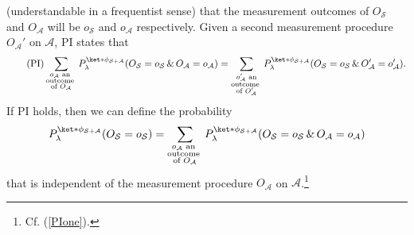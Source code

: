 \documentclass[12pt]{report}
\begin{document}
  (understandable in a frequentist sense) that the measurement outcomes of $O_{\mathcal{S}}$ and $O_{\mathcal{A}}$ will be $o_{\mathcal{S}}$  and $o_{\mathcal{A}}$ respectively. Given a second measurement procedure $O_{\mathcal{A}}'$ on $\mathcal{A}$, PI states that
\begin{equation}\tag{PI}
	\sum_{\substack{o_\mathcal{A}\text{ an }\\ \text{outcome }\\ 
	 \text{of }O_{\mathcal{A}}}}P_\lambda^{\ket*{\phi}_{\mathcal{S}+\mathcal{A}}}(O_\mathcal{S}=o_\mathcal{S}\, \& \,O_\mathcal{A}=o_\mathcal{A}) = \sum_{\substack{o_\mathcal{A}'\text{ an}\\ \text{outcome }\\ 
	 \text{of }O_{\mathcal{A}}'}}P_\lambda^{\ket*{\phi}_{\mathcal{S}+\mathcal{A}}}(O_\mathcal{S}=o_\mathcal{S}\, \& \,O'_\mathcal{A}=o'_\mathcal{A}). 
\end{equation}
If PI holds, then we can define the probability
\begin{equation}\label{generalPI}
	P^{\ket*{\phi}_{\mathcal{S}+\mathcal{A}}}_{\lambda}(O_\mathcal{S}=o_\mathcal{S})=\sum_{\substack{o_\mathcal{A}\text{ an }\\ \text{outcome }\\ 
	\text{of }O_{\mathcal{A}}}}P_\lambda^{\ket*{\phi}_{\mathcal{S}+\mathcal{A}}}(O_\mathcal{S}=o_\mathcal{S}\, \& \,O_\mathcal{A}=o_\mathcal{A})
\end{equation} %
%
that is independent of the measurement procedure $O_\mathcal{A}$ on $\mathcal{A}$.\footnote{Cf. (\ref{PIone}).}
\end{document}
